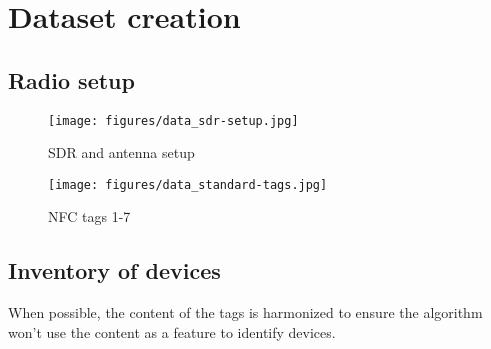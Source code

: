 \section{Dataset creation}

\subsection{Radio setup}

\begin{figure}[htp!]
  \centering
  \texttt{[image: figures/data\_sdr-setup.jpg]}
  \caption{SDR and antenna setup}
  \label{fig:radio-setup}
\end{figure}

\begin{figure}[htp!]
  \centering
  \texttt{[image: figures/data\_standard-tags.jpg]}
  \caption{NFC tags 1-7}
  \label{fig:tags}
\end{figure}

\subsection{Inventory of devices}

When possible, the content of the tags is harmonized to ensure the algorithm won't use the content as a feature to identify devices.

